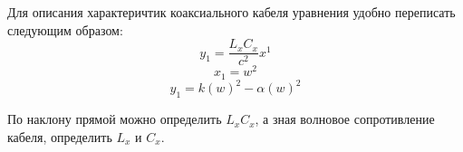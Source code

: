 \begin{figure}[ht!]
\end{figure}
\begin{figure}[ht!]
\end{figure}


Для описания характеричтик коаксиального кабеля уравнения удобно переписать следующим образом:
\[
    y_{1} = \frac{L_{x}C_{x}}{c^{2}}x^{1}
\]
\[
    x_{1}=w^{2}
\]
\[
    y_{1}=k(w)^{2}- \alpha (w)^{2}
\]

По наклону прямой можно определить $L_{x}C_{x}$, а зная волновое сопротивление кабеля,
определить $L_{x}$ и $C_{x}$.

